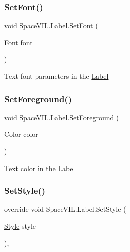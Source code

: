 \subsubsection{\texorpdfstring{Set\+Font()}{SetFont()}}
{\footnotesize\ttfamily void Space\+V\+I\+L.\+Label.\+Set\+Font (\begin{DoxyParamCaption}\item[{Font}]{font }\end{DoxyParamCaption})\hspace{0.3cm}{\ttfamily [inline]}}



Text font parameters in the \mbox{\hyperlink{class_space_v_i_l_1_1_label}{Label}} 

\mbox{\label{class_space_v_i_l_1_1_label_a0e188eabb84af83b0bedf3c59c08273b}} 
\subsubsection{\texorpdfstring{Set\+Foreground()}{SetForeground()}}
{\footnotesize\ttfamily void Space\+V\+I\+L.\+Label.\+Set\+Foreground (\begin{DoxyParamCaption}\item[{Color}]{color }\end{DoxyParamCaption})\hspace{0.3cm}{\ttfamily [inline]}}



Text color in the \mbox{\hyperlink{class_space_v_i_l_1_1_label}{Label}} 

\mbox{\label{class_space_v_i_l_1_1_label_ae98bd34b1931300d5a6c908f80260ad8}} 
\subsubsection{\texorpdfstring{Set\+Style()}{SetStyle()}}
{\footnotesize\ttfamily override void Space\+V\+I\+L.\+Label.\+Set\+Style (\begin{DoxyParamCaption}\item[{\mbox{\hyperlink{class_space_v_i_l_1_1_decorations_1_1_style}{Style}}}]{style }\end{DoxyParamCaption})\hspace{0.3cm}{\ttfamily [inline]}, {\ttfamily [virtual]}}



